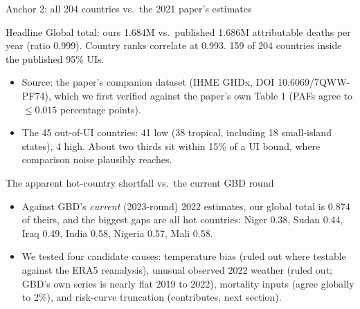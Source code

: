 \documentclass[aspectratio=169,11pt]{beamer}
\begin{document}
\begin{frame}{Anchor 2: all 204 countries vs.\ the 2021 paper's estimates}
  \begin{exampleblock}{Headline}
    Global total: ours 1.684M vs.\ published 1.686M attributable deaths per
    year (ratio 0.999). Country ranks correlate at 0.993. 159 of 204
    countries inside the published 95\% UIs.
  \end{exampleblock}
  \begin{itemize}
    \item Source: the paper's companion dataset (IHME GHDx, DOI
      10.6069/7QWW-PF74), which we first verified against the paper's own
      Table 1 (PAFs agree to \(\le 0.015\) percentage points).
    \item The 45 out-of-UI countries: 41 low (38 tropical, including 18
      small-island states), 4 high. About two thirds sit within 15\% of a UI
      bound, where comparison noise plausibly reaches.
  \end{itemize}
\end{frame}

\begin{frame}{The apparent hot-country shortfall vs.\ the current GBD round}
  \begin{itemize}
    \item Against GBD's \emph{current} (2023-round) 2022 estimates, our
      global total is 0.874 of theirs, and the biggest gaps are all hot
      countries: Niger 0.38, Sudan 0.44, Iraq 0.49, India 0.58, Nigeria
      0.57, Mali 0.58.
    \item We tested four candidate causes: temperature bias (ruled out where
      testable against the ERA5 reanalysis), unusual observed 2022 weather
      (ruled out; GBD's own series is nearly flat 2019 to 2022), mortality
      inputs (agree globally to 2\%), and risk-curve truncation
      (contributes, next section).
  \end{itemize}
\end{frame}
\end{document}
